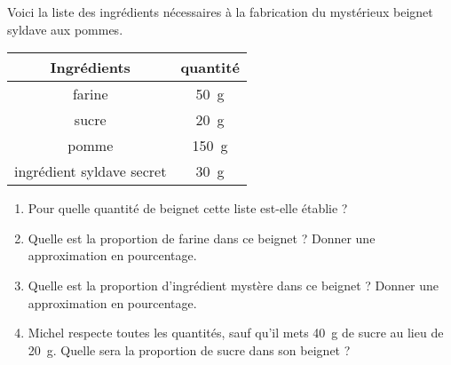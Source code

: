 
\begin{exercice}\label{exo2smath-0323}

    Voici la liste des ingrédients nécessaires à la fabrication du mystérieux beignet syldave aux pommes.
    \begin{center}
    \begin{tabular}[]{|c||c|}
        \hline
        Ingrédients&quantité\\
        \hline\hline
        farine&\SI{50}{\gram}\\
        \hline
        sucre&\SI{20}{\gram}\\
        \hline
        pomme&\SI{150}{\gram}\\
        \hline
        ingrédient syldave secret&\SI{30}{\gram}\\
        \hline
    \end{tabular}
    \end{center}
    \begin{enumerate}
        \item
            Pour quelle quantité de beignet cette liste est-elle établie ?
        \item
            Quelle est la proportion de farine dans ce beignet ? Donner une approximation en pourcentage.
        \item
            Quelle est la proportion d'ingrédient mystère dans ce beignet ? Donner une approximation en pourcentage.
        \item
            Michel respecte toutes les quantités, sauf qu'il mets \SI{40}{\gram} de sucre au lieu de \SI{20}{\gram}. Quelle sera la proportion de sucre dans son beignet ?
    \end{enumerate}

\end{exercice}

